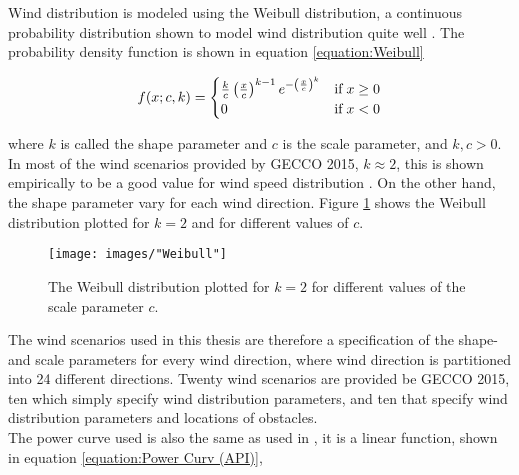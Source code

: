 \noindent Wind distribution is modeled using the Weibull distribution, a continuous probability distribution shown to model wind distribution quite well \citep{Justus}. The probability density function is shown in equation \ref{equation:Weibull}


\begin{equation}
f(x; c, k)  = 
\begin{cases}
\frac{k}{c} \left( \frac{x}{c} \right)^{k-1} e^{- \left( \frac{x}{c} \right)^k } & \text{if} \hspace{1mm} x \geq 0 \\
0                                                                                                                      & \text{if} \hspace{1mm}     x < 0
\end{cases}
\label{equation:Weibull}
\end{equation}


\noindent where $k$ is called the shape parameter and $c$ is the scale parameter, and $k, c > 0$. In most of the wind scenarios provided by GECCO 2015, $k \approx 2$, this is shown empirically to be a good value for wind speed distribution \citep{Justus}. On the other hand, the shape parameter vary for each wind direction. Figure \ref{figure:weibull distribution} shows the Weibull distribution plotted for $k = 2$ and for different values of $c$. \\


\begin{figure}[h!]
\begin{center}
\texttt{[image: images/"Weibull"]}
\caption{The Weibull distribution plotted for $k = 2$ for different values of the scale parameter $c$.}
\label{figure:weibull distribution}
\end{center}
\end{figure}

\noindent The wind scenarios used in this thesis are therefore a specification of the shape- and scale parameters for every wind direction, where wind direction is partitioned into 24 different directions. Twenty wind scenarios are provided be GECCO 2015, ten which simply specify wind distribution parameters, and ten that specify wind distribution parameters and locations of obstacles. \\

\noindent The power curve used is also the same as used in \cite{Kusiak}, it is a linear function, shown in equation \ref{equation:Power Curv (API)},

